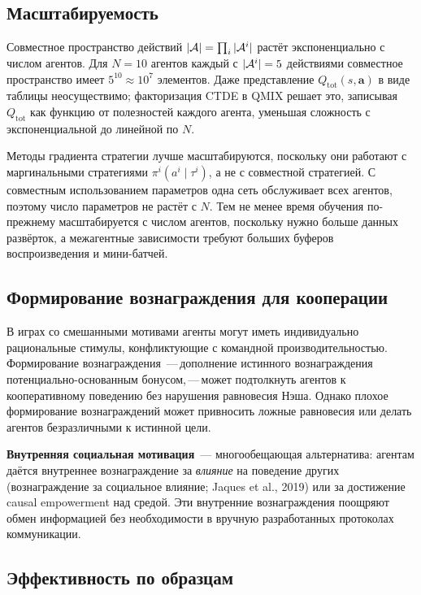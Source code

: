 \subsection{Масштабируемость}

Совместное пространство действий $|\mathcal{A}| = \prod_i |\mathcal{A}^i|$ растёт экспоненциально
с числом агентов. Для $N = 10$ агентов каждый с $|\mathcal{A}^i| = 5$
действиями совместное пространство имеет $5^{10} \approx 10^7$ элементов. Даже
представление $Q_\mathrm{tot}(s, \bm{a})$ в виде таблицы неосуществимо;
факторизация CTDE в QMIX решает это, записывая
$Q_\mathrm{tot}$ как функцию от полезностей каждого агента, уменьшая
сложность с экспоненциальной до линейной по $N$.

Методы градиента стратегии лучше масштабируются, поскольку они работают с
маргинальными стратегиями $\pi^i(a^i \mid \tau^i)$, а не с совместной
стратегией. С совместным использованием параметров одна сеть обслуживает всех агентов,
поэтому число параметров не растёт с $N$. Тем не менее
время обучения по-прежнему масштабируется с числом агентов, поскольку нужно больше
данных развёрток, а межагентные зависимости требуют больших
буферов воспроизведения и мини-батчей.

\subsection{Формирование вознаграждения для кооперации}

В играх со смешанными мотивами агенты могут иметь индивидуально рациональные
стимулы, конфликтующие с командной производительностью. Формирование вознаграждения
\,---\,дополнение истинного вознаграждения
потенциально-основанным бонусом,\,---\,может подтолкнуть агентов к
кооперативному поведению без нарушения равновесия Нэша.
Однако плохое формирование вознаграждений может привносить ложные равновесия
или делать агентов безразличными к истинной цели.

\textbf{Внутренняя социальная мотивация}~---
многообещающая альтернатива: агентам даётся внутреннее вознаграждение
за \emph{влияние} на поведение других (вознаграждение за социальное влияние;
Jaques et al., 2019) или за достижение causal empowerment
над средой. Эти внутренние вознаграждения поощряют обмен информацией
без необходимости в вручную разработанных протоколах коммуникации.

\subsection{Эффективность по образцам}

